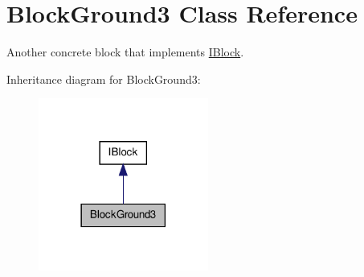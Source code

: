\hypertarget{class_block_ground3}{\section{Block\-Ground3 Class Reference}
\label{class_block_ground3}
}


Another concrete block that implements \hyperlink{class_i_block}{I\-Block}.  




Inheritance diagram for Block\-Ground3\-:\nopagebreak
\begin{figure}[H]
\begin{center}
\leavevmode
\includegraphics[width=158pt]{class_block_ground3__inherit__graph}
\end{center}
\end{figure}
